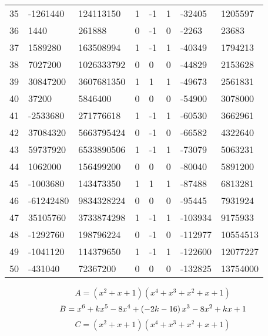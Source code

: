 \documentclass{amsart}
\begin{document}
\begin{longtable}{|l|l|l|lllll|}
35&-1261440&124113150&1&-1&1&-32405&1205597\\
36&1440&261888&0&-1&0&-2263&23683\\
37&1589280&163508994&1&-1&1&-40349&1794213\\
38&7027200&1026333792&0&0&0&-44829&2153628\\
39&30847200&3607681350&1&1&1&-49673&2561831\\
40&37200&5846400&0&0&0&-54900&3078000\\
41&-2533680&271776618&1&-1&1&-60530&3662961\\
42&37084320&5663795424&0&-1&0&-66582&4322640\\
43&59737920&6533890506&1&-1&1&-73079&5063231\\
44&1062000&156499200&0&0&0&-80040&5891200\\
45&-1003680&143473350&1&1&1&-87488&6813281\\
46&-61242480&9834328224&0&0&0&-95445&7931924\\
47&35105760&3733874298&1&-1&1&-103934&9175933\\
48&-1292760&198796224&0&-1&0&-112977&10554513\\
49&-1041120&114379650&1&-1&1&-122600&12077227\\
50&-431040&72367200&0&0&0&-132825&13754000\\
\hline
\end{longtable}
$$A=(x^2
 + x
 + 1)(x^4
 + x^3
 + x^2
 + x
 + 1)$$
$$B=x^6
 + k\*x^5
 - 8\*x^4
 + \left(-2\*k
 - 16\right) \*x^3
 - 8\*x^2
 + k\*x
 + 1$$
$$C=(x^2
 + x
 + 1)(x^4
 + x^3
 + x^2
 + x
 + 1)$$
\end{document}
